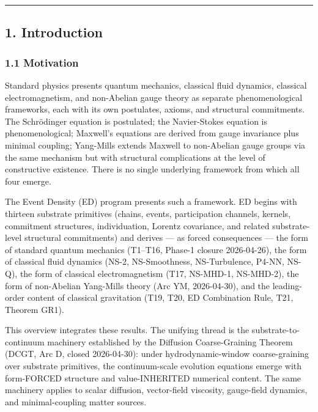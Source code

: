 \documentclass[
  11pt,
  a4paper,
]{article}
\begin{document}
\begin{center}\rule{0.5\linewidth}{0.5pt}\end{center}

\subsection{1. Introduction}\label{introduction}

\subsubsection{1.1 Motivation}\label{motivation}

Standard physics presents quantum mechanics, classical fluid dynamics,
classical electromagnetism, and non-Abelian gauge theory as separate
phenomenological frameworks, each with its own postulates, axioms, and
structural commitments. The Schrödinger equation is postulated; the
Navier-Stokes equation is phenomenological; Maxwell's equations are
derived from gauge invariance plus minimal coupling; Yang-Mills extends
Maxwell to non-Abelian gauge groups via the same mechanism but with
structural complications at the level of constructive existence. There
is no single underlying framework from which all four emerge.

The Event Density (ED) program presents such a framework. ED begins with
thirteen substrate primitives (chains, events, participation channels,
kernels, commitment structures, individuation, Lorentz covariance, and
related substrate-level structural commitments) and derives --- as
forced consequences --- the form of standard quantum mechanics (T1--T16,
Phase-1 closure 2026-04-26), the form of classical fluid dynamics (NS-2,
NS-Smoothness, NS-Turbulence, P4-NN, NS-Q), the form of classical
electromagnetism (T17, NS-MHD-1, NS-MHD-2), the form of non-Abelian
Yang-Mills theory (Arc YM, 2026-04-30), and the leading-order content of
classical gravitation (T19, T20, ED Combination Rule, T21, Theorem GR1).

This overview integrates these results. The unifying thread is the
substrate-to-continuum machinery established by the Diffusion
Coarse-Graining Theorem (DCGT, Arc D, closed 2026-04-30): under
hydrodynamic-window coarse-graining over substrate primitives, the
continuum-scale evolution equations emerge with form-FORCED structure
and value-INHERITED numerical content. The same machinery applies to
scalar diffusion, vector-field viscosity, gauge-field dynamics, and
minimal-coupling matter sources.
\end{document}
